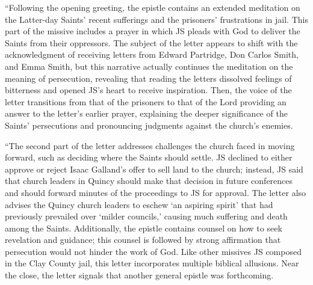 			``Following the opening greeting, the epistle contains an extended meditation on the Latter-day Saints' recent sufferings and the prisoners' frustrations in jail. This part of the missive includes a prayer in which JS pleads with God to deliver the Saints from their oppressors. The subject of the letter appears to shift with the acknowledgment of receiving letters from Edward Partridge, Don Carlos Smith, and Emma Smith, but this narrative actually continues the meditation on the meaning of persecution, revealing that reading the letters dissolved feelings of bitterness and opened JS's heart to receive inspiration. Then, the voice of the letter transitions from that of the prisoners to that of the Lord providing an answer to the letter's earlier prayer, explaining the deeper significance of the Saints' persecutions and pronouncing judgments against the church's enemies.
			
			``The second part of the letter addresses challenges the church faced in moving forward, such as deciding where the Saints should settle. JS declined to either approve or reject Isaac Galland's offer to sell land to the church; instead, JS said that church leaders in Quincy should make that decision in future conferences and should forward minutes of the proceedings to JS for approval. The letter also advises the Quincy church leaders to eschew `an aspiring spirit' that had previously prevailed over `milder councils,' causing much suffering and death among the Saints. Additionally, the epistle contains counsel on how to seek revelation and guidance; this counsel is followed by strong affirmation that persecution would not hinder the work of God. Like other missives JS composed in the Clay County jail, this letter incorporates multiple biblical allusions. Near the close, the letter signals that another general epistle was forthcoming.
			
